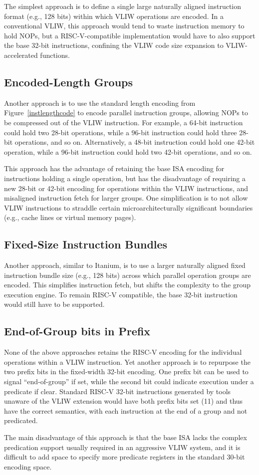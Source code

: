 The simplest approach is to define a single large naturally aligned
instruction format (e.g., 128 bits) within which VLIW operations are
encoded.  In a conventional VLIW, this approach would tend to waste
instruction memory to hold NOPs, but a RISC-V-compatible
implementation would have to also support the base 32-bit
instructions, confining the VLIW code size expansion to
VLIW-accelerated functions.

\subsection*{Encoded-Length Groups}

Another approach is to use the standard length encoding from
Figure~\ref{instlengthcode} to encode parallel instruction groups,
allowing NOPs to be compressed out of the VLIW instruction.  For
example, a 64-bit instruction could hold two 28-bit operations, while
a 96-bit instruction could hold three 28-bit operations, and so on.
Alternatively, a 48-bit instruction could hold one 42-bit operation,
while a 96-bit instruction could hold two 42-bit operations, and so
on.

This approach has the advantage of retaining the base ISA encoding for
instructions holding a single operation, but has the disadvantage of
requiring a new 28-bit or 42-bit encoding for operations within the
VLIW instructions, and misaligned instruction fetch for larger groups.
One simplification is to not allow VLIW instructions to straddle
certain microarchitecturally significant boundaries (e.g., cache lines
or virtual memory pages).

\subsection*{Fixed-Size Instruction Bundles}

Another approach, similar to Itanium, is to use a larger naturally
aligned fixed instruction bundle size (e.g., 128 bits) across which
parallel operation groups are encoded.  This simplifies instruction
fetch, but shifts the complexity to the group execution engine.  To
remain RISC-V compatible, the base 32-bit instruction would still have
to be supported.

\subsection*{End-of-Group bits in Prefix}

None of the above approaches retains the RISC-V encoding for the
individual operations within a VLIW instruction.  Yet another approach
is to repurpose the two prefix bits in the fixed-width 32-bit
encoding.  One prefix bit can be used to signal ``end-of-group'' if
set, while the second bit could indicate execution under a predicate
if clear.  Standard RISC-V 32-bit instructions generated by tools
unaware of the VLIW extension would have both prefix bits set (11) and
thus have the correct semantics, with each instruction at the end of a
group and not predicated.

The main disadvantage of this approach is that the base ISA lacks the
complex predication support usually required in an aggressive VLIW
system, and it is difficult to add space to specify more predicate
registers in the standard 30-bit encoding space.
